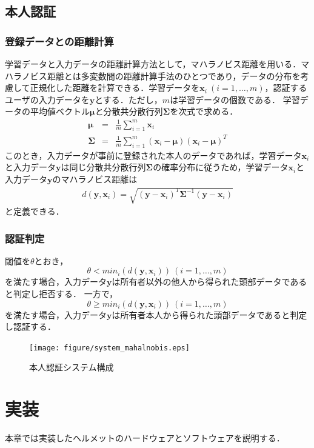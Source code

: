 \documentclass[Japanese,noauthor]{dicomopapers}
\begin{document}
\subsection{本人認証}
\subsubsection{登録データとの距離計算}
学習データと入力データの距離計算方法として，マハラノビス距離を用いる．マハラノビス距離とは多変数間の距離計算手法のひとつであり，データの分布を考慮して正規化した距離を計算できる．学習データを$\bm{x}_i~(i=1,\dots, m)$，認証するユーザの入力データを$\bm{y}$とする．ただし，$m$は学習データの個数である．
学習データの平均値ベクトル$\bm{\mu}$と分散共分散行列$\bm{\Sigma}$を次式で求める．
\begin{eqnarray}
  \bm{\mu} &=& \frac{1}{m}\sum_{i=1}^{m}\bm{x}_i \\
  \bm{\Sigma} &=& \frac{1}{m}\sum_{i=1}^{m}(\bm{x}_i-\bm{\mu})(\bm{x}_i-\bm{\mu})^T
\end{eqnarray}
このとき，入力データが事前に登録された本人のデータであれば，学習データ$\bm{x}_i$と入力データ$\bm{y}$は同じ分散共分散行列$\bm{\Sigma}$の確率分布に従うため，学習データ$\bm{x}_i$と入力データ$\bm{y}$のマハラノビス距離は
\begin{eqnarray}
  d(\bm{y},\bm{x}_i) = \sqrt{(\bm{y}-\bm{x}_i)^{T}\bm{\Sigma}^{-1}(\bm{y}-\bm{x}_i)}
\end{eqnarray}
と定義できる．

\subsubsection{認証判定}
閾値を$\theta$とおき，
\[
  \theta < min_i(d(\bm{y},\bm{x}_i))~(i=1,\dots,m)
\]
を満たす場合，入力データ$\bm{y}$は所有者以外の他人から得られた頭部データであると判定し拒否する．
一方で，
\[
  \theta \geq min_i(d(\bm{y},\bm{x}_i))~(i=1,\dots,m)
\]
を満たす場合，入力データ$\bm{y}$は所有者本人から得られた頭部データであると判定し認証する．

\begin{figure}[!t]
  \centering
    \texttt{[image: figure/system\_mahalnobis.eps]}
  \caption{本人認証システム構成}
  \label{system_mahalnobis}
\end{figure}

\section{実装}
\label{make}
本章では実装したヘルメットのハードウェアとソフトウェアを説明する．
\end{document}
